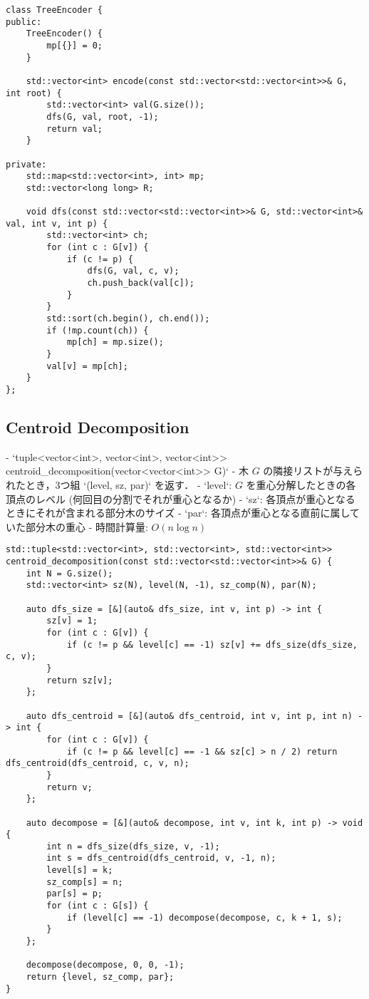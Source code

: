 \begin{lstlisting}
class TreeEncoder {
public:
    TreeEncoder() {
        mp[{}] = 0;
    }

    std::vector<int> encode(const std::vector<std::vector<int>>& G, int root) {
        std::vector<int> val(G.size());
        dfs(G, val, root, -1);
        return val;
    }

private:
    std::map<std::vector<int>, int> mp;
    std::vector<long long> R;

    void dfs(const std::vector<std::vector<int>>& G, std::vector<int>& val, int v, int p) {
        std::vector<int> ch;
        for (int c : G[v]) {
            if (c != p) {
                dfs(G, val, c, v);
                ch.push_back(val[c]);
            }
        }
        std::sort(ch.begin(), ch.end());
        if (!mp.count(ch)) {
            mp[ch] = mp.size();
        }
        val[v] = mp[ch];
    }
};
\end{lstlisting}

\subsection{Centroid Decomposition}

\begin{small}
\begin{markdown}
- `tuple<vector<int>, vector<int>, vector<int>> centroid\_decomposition(vector<vector<int>> G)`
  - 木 $G$ の隣接リストが与えられたとき，3つ組 `(level, sz, par)` を返す．
    - `level`: $G$ を重心分解したときの各頂点のレベル (何回目の分割でそれが重心となるか)
    - `sz`: 各頂点が重心となるときにそれが含まれる部分木のサイズ
    - `par`: 各頂点が重心となる直前に属していた部分木の重心
  - 時間計算量: $O(n\log n)$

\end{markdown}
\end{small}

\begin{lstlisting}
std::tuple<std::vector<int>, std::vector<int>, std::vector<int>> centroid_decomposition(const std::vector<std::vector<int>>& G) {
    int N = G.size();
    std::vector<int> sz(N), level(N, -1), sz_comp(N), par(N);

    auto dfs_size = [&](auto& dfs_size, int v, int p) -> int {
        sz[v] = 1;
        for (int c : G[v]) {
            if (c != p && level[c] == -1) sz[v] += dfs_size(dfs_size, c, v);
        }
        return sz[v];
    };

    auto dfs_centroid = [&](auto& dfs_centroid, int v, int p, int n) -> int {
        for (int c : G[v]) {
            if (c != p && level[c] == -1 && sz[c] > n / 2) return dfs_centroid(dfs_centroid, c, v, n);
        }
        return v;
    };

    auto decompose = [&](auto& decompose, int v, int k, int p) -> void {
        int n = dfs_size(dfs_size, v, -1);
        int s = dfs_centroid(dfs_centroid, v, -1, n);
        level[s] = k;
        sz_comp[s] = n;
        par[s] = p;
        for (int c : G[s]) {
            if (level[c] == -1) decompose(decompose, c, k + 1, s);
        }
    };

    decompose(decompose, 0, 0, -1);
    return {level, sz_comp, par};
}
\end{lstlisting}

